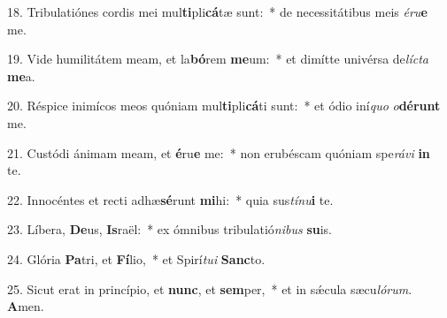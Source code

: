 18. Tribulatiónes cordis mei mul\textbf{ti}pli\textbf{cá}tæ sunt:~*  de necessitátibus meis \textit{é}\textit{ru}\textbf{e} me.\

19. Vide humilitátem meam, et la\textbf{bó}rem \textbf{me}um:~*  et dimítte univérsa de\textit{líc}\textit{ta} \textbf{me}a.\

20. Réspice inimícos meos quóniam mul\textbf{ti}pli\textbf{cá}ti sunt:~*  et ódio iní\textit{quo} \textit{o}\textbf{dé}\textbf{runt} me.\

21. Custódi ánimam meam, et \textbf{é}ru\textbf{e} me:~*  non erubéscam quóniam spe\textit{rá}\textit{vi} \textbf{in} te.\

22. Innocéntes et recti adhæ\textbf{sé}runt \textbf{mi}hi:~*  quia sus\textit{tí}\textit{nu}\textbf{i} te.\

23. Líbera, \textbf{De}us, \textbf{Is}raël:~*  ex ómnibus tribulatió\textit{ni}\textit{bus} \textbf{su}is.\

24. Glória \textbf{Pa}tri, et \textbf{Fí}lio,~*  et Spirí\textit{tu}\textit{i} \textbf{Sanc}to.\

25. Sicut erat in princípio, et \textbf{nunc}, et \textbf{sem}per,~*  et in sǽcula sæcu\textit{ló}\textit{rum}. \textbf{A}men.\

